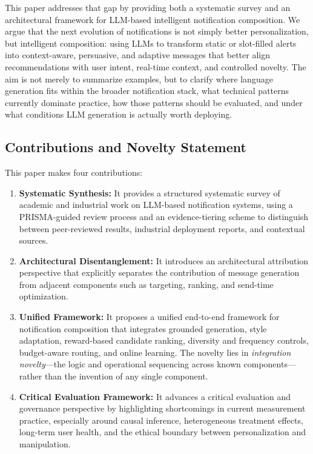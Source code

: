 \documentclass[sigconf]{acmart}
\begin{document}
This paper addresses that gap by providing both a systematic survey and an architectural framework for LLM-based intelligent notification composition. We argue that the next evolution of notifications is not simply better personalization, but intelligent composition: using LLMs to transform static or slot-filled alerts into context-aware, persuasive, and adaptive messages that better align recommendations with user intent, real-time context, and controlled novelty. The aim is not merely to summarize examples, but to clarify where language generation fits within the broader notification stack, what technical patterns currently dominate practice, how those patterns should be evaluated, and under what conditions LLM generation is actually worth deploying.

\subsection{Contributions and Novelty Statement}

This paper makes four contributions:

\begin{enumerate}
    \item \textbf{Systematic Synthesis:} It provides a structured systematic survey of academic and industrial work on LLM-based notification systems, using a PRISMA-guided review process and an evidence-tiering scheme to distinguish between peer-reviewed results, industrial deployment reports, and contextual sources.
    \item \textbf{Architectural Disentanglement:} It introduces an architectural attribution perspective that explicitly separates the contribution of message generation from adjacent components such as targeting, ranking, and send-time optimization.
    \item \textbf{Unified Framework:} It proposes a unified end-to-end framework for notification composition that integrates grounded generation, style adaptation, reward-based candidate ranking, diversity and frequency controls, budget-aware routing, and online learning. The novelty lies in \textit{integration novelty}---the logic and operational sequencing across known components---rather than the invention of any single component.
    \item \textbf{Critical Evaluation Framework:} It advances a critical evaluation and governance perspective by highlighting shortcomings in current measurement practice, especially around causal inference, heterogeneous treatment effects, long-term user health, and the ethical boundary between personalization and manipulation.
\end{enumerate}
\end{document}
